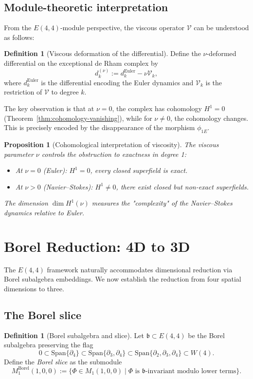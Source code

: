 \documentclass[reqno,10pt]{amsart}
\theoremstyle{plain}
\newtheorem{proposition}[theorem]{Proposition}
\theoremstyle{definition}
\newtheorem{definition}[theorem]{Definition}
\def\gE{E(4,4)}
\begin{document}
\subsection{Module-theoretic interpretation}

From the $\gE$-module perspective, the viscous operator $\mathcal{V}$ can be understood as follows:

\begin{definition}[Viscous deformation of the differential]
Define the $\nu$-deformed differential on the exceptional de Rham complex by
\[
  d_k^{(\nu)} := d_k^{\text{Euler}} - \nu\mathcal{V}_k,
\]
where $d_k^{\text{Euler}}$ is the differential encoding the Euler dynamics and $\mathcal{V}_k$ is the restriction of $\mathcal{V}$ to degree $k$.
\end{definition}

The key observation is that at $\nu=0$, the complex has cohomology $H^1=0$ (Theorem~\ref{thm:cohomology-vanishing}), while for $\nu\neq 0$, the cohomology changes. This is precisely encoded by the disappearance of the morphism $\phi_{1E}$.

\begin{proposition}[Cohomological interpretation of viscosity]
The viscous parameter $\nu$ controls the obstruction to exactness in degree 1:
\begin{itemize}
\item At $\nu=0$ (Euler): $H^1=0$, every closed superfield is exact.
\item At $\nu>0$ (Navier--Stokes): $H^1\neq 0$, there exist closed but non-exact superfields.
\end{itemize}
The dimension $\dim H^1(\nu)$ measures the "complexity" of the Navier--Stokes dynamics relative to Euler.
\end{proposition}

\section{Borel Reduction: 4D to 3D}

The $\gE$ framework naturally accommodates dimensional reduction via Borel subalgebra embeddings. We now establish the reduction from four spatial dimensions to three.

\subsection{The Borel slice}

\begin{definition}[Borel subalgebra and slice]
Let $\mathfrak{b}\subset \gE$ be the Borel subalgebra preserving the flag
\[
  0 \subset \text{Span}\{\partial_4\} \subset \text{Span}\{\partial_3,\partial_4\} \subset \text{Span}\{\partial_2,\partial_3,\partial_4\} \subset W(4).
\]
Define the \emph{Borel slice} as the submodule
\[
  M_1^{\text{Borel}}(1,0,0) := \{ \Phi \in M_1(1,0,0) \mid \Phi \text{ is } \mathfrak{b}\text{-invariant modulo lower terms}\}.
\]
\end{definition}
\end{document}

